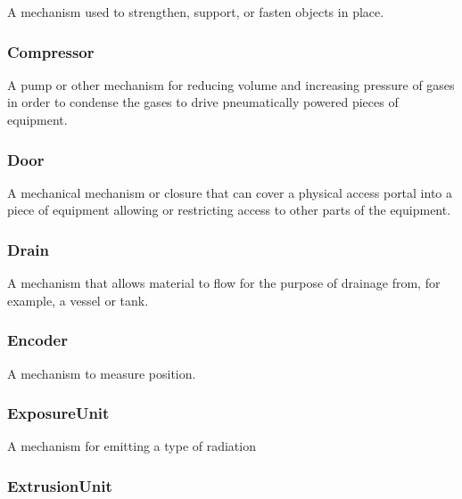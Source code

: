 A mechanism used to strengthen, support, or fasten objects in place.

\FloatBarrier

\subsubsection{Compressor}
\label{sec:Compressor}



A pump or other mechanism for reducing volume and increasing pressure of gases in order to condense the gases to drive pneumatically powered pieces of equipment.

\FloatBarrier

\subsubsection{Door}




A mechanical mechanism or closure that can cover a physical access portal into a piece of equipment allowing or restricting access to other parts of the equipment.

\FloatBarrier

\subsubsection{Drain}
\label{sec:Drain}



A mechanism that allows material to flow for the purpose of drainage from, for example, a vessel or tank.

\FloatBarrier

\subsubsection{Encoder}
\label{sec:Encoder}



A mechanism to measure position.

\FloatBarrier

\subsubsection{ExposureUnit}
\label{sec:ExposureUnit}



A mechanism for emitting a type of radiation

\FloatBarrier

\subsubsection{ExtrusionUnit}
\label{sec:ExtrusionUnit}



